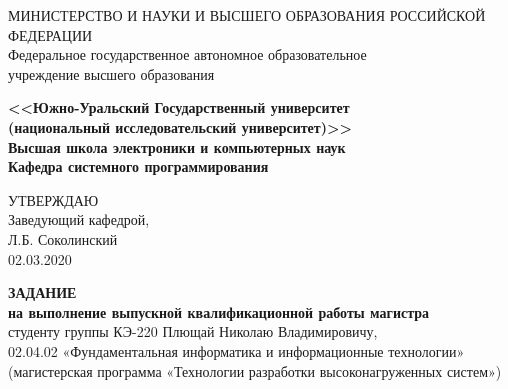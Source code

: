 \begin{titlepage}
    
    \begin{center}
        МИНИСТЕРСТВО И НАУКИ И ВЫСШЕГО ОБРАЗОВАНИЯ РОССИЙСКОЙ ФЕДЕРАЦИИ\\
        Федеральное государственное автономное образовательное\\
        учреждение высшего образования

        \textbf{
        <<Южно-Уральский Государственный университет\\
        (национальный исследовательский университет)>>\\
        Высшая школа электроники и компьютерных наук\\
        Кафедра системного программирования
        }
        \bigskip
    \end{center}

    \hfill
    \begin{minipage}{0.4\textwidth}
        УТВЕРЖДАЮ\\
        Заведующий кафедрой,\\
        \underline{\hspace{2cm}} Л.Б. Соколинский\\
        02.03.2020
    \end{minipage}

    \begin{center}
        \textbf{ЗАДАНИЕ}\\
        \textbf{на выполнение выпускной квалификационной работы магистра}\\
        студенту группы КЭ-220 Плющай Николаю Владимировичу,\\
        02.04.02 «Фундаментальная информатика и информационные технологии»\\
        (магистерская программа «Технологии разработки высоконагруженных систем»)\\
    \end{center}


\end{titlepage}
